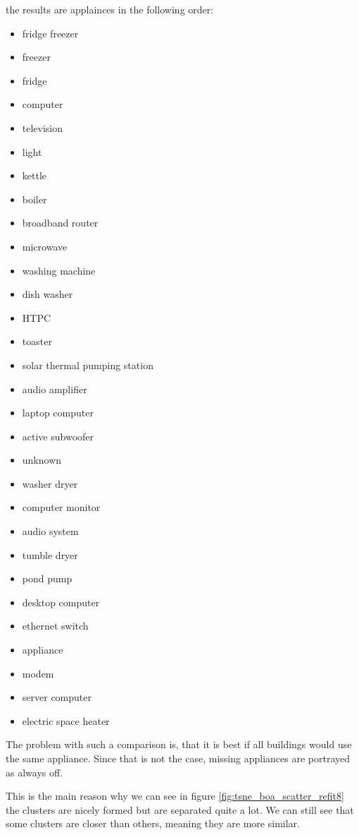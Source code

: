 the results are applainces in the following order:

\begin{itemize}
	\item fridge freezer
	\item freezer
	\item fridge
	\item computer
	\item television
	\item light
	\item kettle
	\item boiler
	\item broadband router
	\item microwave
	\item washing machine
	\item dish washer
	\item HTPC
	\item toaster
	\item solar thermal pumping station
	\item audio amplifier
	\item laptop computer
	\item active subwoofer
	\item unknown
	\item washer dryer
	\item computer monitor
	\item audio system
	\item tumble dryer
	\item pond pump
	\item desktop computer
	\item ethernet switch
	\item appliance
	\item modem
	\item server computer
	\item electric space heater
\end{itemize}

The problem with such a comparison is, that it is best 
if all buildings would use the same appliance.
Since that is not the case, missing appliances are portrayed as always off. 

This is the main reason why we can see in figure \ref{fig:tsne_boa_scatter_refit8} the clusters are nicely formed
but are separated quite a lot. We can still see that some clusters are closer than others,
meaning they are more similar.

